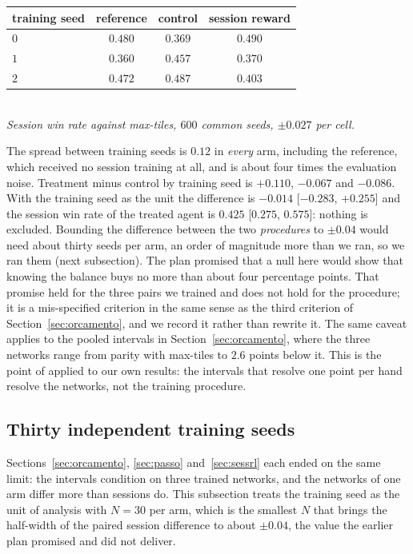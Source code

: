 \documentclass[11pt]{article}
\begin{document}
\begin{center}\small
\begin{tabular}{lccc}\toprule
training seed & reference & control & session reward\\\midrule
$0$ & $0.480$ & $0.369$ & $0.490$\\
$1$ & $0.360$ & $0.457$ & $0.370$\\
$2$ & $0.472$ & $0.487$ & $0.403$\\\bottomrule
\end{tabular}\\[2pt]
\emph{Session win rate against max-tiles, $600$ common seeds, $\pm0.027$ per cell.}
\end{center}

The spread between training seeds is $0.12$ in \emph{every} arm, including the reference, which received no session training at all, and is about four times the evaluation noise. Treatment minus control by training seed is $+0.110$, $-0.067$ and $-0.086$. With the training seed as the unit the difference is $-0.014$ [$-0.283$, $+0.255$] and the session win rate of the treated agent is $0.425$ [$0.275$, $0.575$]: nothing is excluded. Bounding the difference between the two \emph{procedures} to $\pm0.04$ would need about thirty seeds per arm, an order of magnitude more than we ran, so we ran them (next subsection). The plan promised that a null here would show that knowing the balance buys no more than about four percentage points. That promise held for the three pairs we trained and does not hold for the procedure; it is a mis-specified criterion in the same sense as the third criterion of Section~\ref{sec:orcamento}, and we record it rather than rewrite it. The same caveat applies to the pooled intervals in Section~\ref{sec:orcamento}, where the three networks range from parity with max-tiles to $2.6$ points below it. This is the point of \cite{agarwal2021} applied to our own results: the intervals that resolve one point per hand resolve the networks, not the training procedure.

\subsection{Thirty independent training seeds}\label{sec:trinta}
Sections~\ref{sec:orcamento}, \ref{sec:passo} and~\ref{sec:sessrl} each ended on the same limit: the intervals condition on three trained networks, and the networks of one arm differ more than sessions do. This subsection treats the training seed as the unit of analysis with $N=30$ per arm, which is the smallest $N$ that brings the half-width of the paired session difference to about $\pm0.04$, the value the earlier plan promised and did not deliver.
\end{document}
